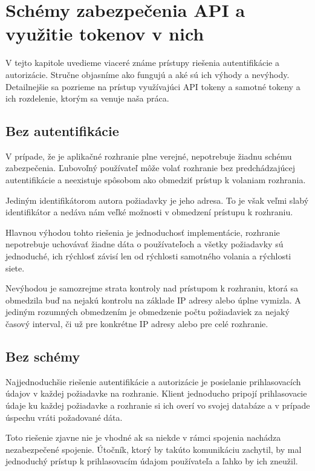 \chapter{Schémy zabezpečenia API a využitie tokenov v nich}

\label{kap:vyuzitie} %

V tejto kapitole uvedieme viaceré známe prístupy riešenia autentifikácie a autorizácie. Stručne objasníme ako fungujú a aké sú ich výhody a nevýhody. Detailnejšie sa pozrieme na prístup využívajúci API tokeny a samotné tokeny a ich rozdelenie, ktorým sa venuje naša práca.

\section{Bez autentifikácie}

V prípade, že je aplikačné rozhranie plne verejné, nepotrebuje žiadnu schému zabezpečenia. Ľubovoľný používateľ môže volať rozhranie bez predchádzajúcej autentifikácie a neexistuje spôsobom ako obmedziť prístup k volaniam rozhrania.

Jediným identifikátorom autora požiadavky je jeho adresa. To je však veľmi slabý identifikátor a nedáva nám veľké možnosti v obmedzení prístupu k rozhraniu.

Hlavnou výhodou tohto riešenia je jednoduchosť implementácie, rozhranie nepotrebuje uchovávať žiadne dáta o používateľoch a všetky požiadavky sú jednoduché, ich rýchlosť závisí len od rýchlosti samotného volania a rýchlosti siete.

Nevýhodou je samozrejme strata kontroly nad prístupom k rozhraniu, ktorá sa obmedzila buď na nejakú kontrolu na základe IP adresy alebo úplne vymizla. A jediným rozumných obmedzením je obmedzenie počtu požiadaviek za nejaký časový interval, či už pre konkrétne IP adresy alebo pre celé rozhranie.


\section{Bez schémy}

Najjednoduchšie riešenie autentifikácie a autorizácie je posielanie prihlasovacích údajov v každej požiadavke na rozhranie. Klient jednoducho pripojí prihlasovacie údaje ku každej požiadavke a rozhranie si ich overí vo svojej databáze a v prípade úspechu vráti požadované dáta.

Toto riešenie zjavne nie je vhodné ak sa niekde v rámci spojenia nachádza nezabezpečené spojenie. Útočník, ktorý by  takúto komunikáciu zachytil, by mal jednoduchý prístup k prihlasovacím údajom používateľa a ľahko by ich zneužil.

